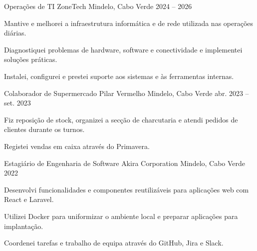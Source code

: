 
\begin{cventries}
  \cventry
    {Operações de TI}
    {ZoneTech}
    {Mindelo, Cabo Verde}
    {2024 -- 2026}
    {
      \begin{cvitems}
        \item {Mantive e melhorei a infraestrutura informática e de rede utilizada nas operações diárias.}
        \item {Diagnostiquei problemas de hardware, software e conectividade e implementei soluções práticas.}
        \item {Instalei, configurei e prestei suporte aos sistemas e às ferramentas internas.}
      \end{cvitems}
    }

  \cventry
    {Colaborador de Supermercado}
    {Pilar Vermelho}
    {Mindelo, Cabo Verde}
    {abr. 2023 -- set. 2023}
    {
      \begin{cvitems}
        \item {Fiz reposição de stock, organizei a secção de charcutaria e atendi pedidos de clientes durante os turnos.}
        \item {Registei vendas em caixa através do Primavera.}
      \end{cvitems}
    }

  \cventry
    {Estagiário de Engenharia de Software}
    {Akira Corporation}
    {Mindelo, Cabo Verde}
    {2022}
    {
      \begin{cvitems}
        \item {Desenvolvi funcionalidades e componentes reutilizáveis para aplicações web com React e Laravel.}
        \item {Utilizei Docker para uniformizar o ambiente local e preparar aplicações para implantação.}
        \item {Coordenei tarefas e trabalho de equipa através do GitHub, Jira e Slack.}
      \end{cvitems}
    }
\end{cventries}
